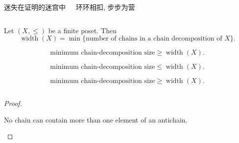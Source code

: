 \begin{frame}{}
  \begin{center}
  \end{center}

  \begin{columns}
      \begin{center}
        迷失在证明的迷宫中
      \end{center}
      \begin{center}
        环环相扣, 步步为营
      \end{center}
  \end{columns}
\end{frame}

\begin{frame}{}
  \begin{theorem}
    Let $(X,\le)$ be a finite poset. Then
    \[
      \operatorname{width}(X) =
      \min\{\text{number of chains in a chain decomposition of }X\}.
    \]
  \end{theorem}

  \pause
  \vspace{2em}
  \begin{lemma}
    \[
      \text{minimum chain-decomposition size} \ge \operatorname{width}(X).
    \]
  \end{lemma}

  \vspace{1em}
  \begin{lemma}
    \[
      \text{minimum chain-decomposition size} \le \operatorname{width}(X).
    \]
  \end{lemma}
\end{frame}

\begin{frame}{}
  \begin{lemma}
    \[
      \text{minimum chain-decomposition size} \ge \operatorname{width}(X).
    \]
  \end{lemma}

  \begin{columns}
  \end{columns}

  \pause
  \begin{proof}
    \begin{center}
      No chain can contain more than one element of an antichain.

      \pause
      \vspace{0.30cm}
    \end{center}
  \end{proof}
\end{frame}

